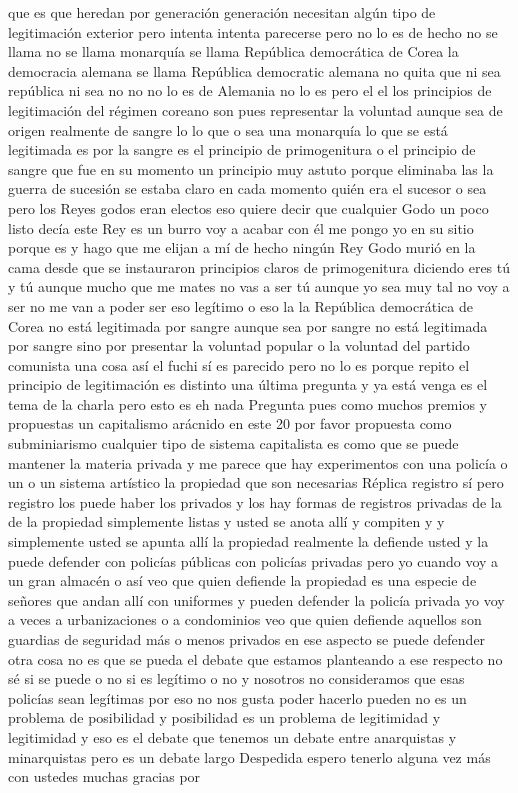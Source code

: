 que es que heredan por generación generación necesitan algún tipo de legitimación exterior pero intenta
intenta parecerse pero no lo es de hecho no se llama no se llama monarquía se llama República democrática de Corea
la democracia alemana se llama República democratic alemana no quita que ni sea república ni sea no
no no lo es de Alemania no lo es pero el el los principios de legitimación del régimen coreano son
pues representar la voluntad aunque sea de origen realmente de sangre lo lo que o sea una monarquía
lo que se está legitimada es por la sangre es el principio de primogenitura o el principio de sangre que fue en su momento un principio muy astuto
porque eliminaba las la guerra de sucesión se estaba claro en cada momento quién era el sucesor o sea pero los Reyes godos eran electos
eso quiere decir que cualquier Godo un poco listo decía este Rey es un burro voy a acabar con él me pongo yo en su sitio porque es
y hago que me elijan a mí de hecho ningún Rey Godo murió en la cama desde que se instauraron principios claros
de primogenitura diciendo eres tú y tú aunque mucho que me mates no vas a ser tú
aunque yo sea muy tal no voy a ser no me van a poder ser eso legítimo o eso la la República democrática de Corea
no está legitimada por sangre aunque sea por sangre no está legitimada por sangre sino por presentar la voluntad popular
o la voluntad del partido comunista una cosa así el fuchi sí
es parecido pero no lo es porque repito el principio de legitimación es distinto
una última pregunta y ya está venga es el tema de la charla pero esto es eh nada
Pregunta
pues como muchos premios y propuestas un capitalismo arácnido en este 20 por favor propuesta como subminiarismo
cualquier tipo de sistema capitalista es como que se puede mantener la materia privada
y me parece que hay experimentos con una policía o un o un sistema artístico la propiedad que son necesarias
Réplica
registro sí pero registro los puede haber los privados y los hay formas de registros privadas de la de la propiedad
simplemente listas y usted se anota allí y compiten y y simplemente usted se apunta allí
la propiedad realmente la defiende usted y la puede defender con policías públicas con policías privadas
pero yo cuando voy a un gran almacén o así veo que quien defiende la propiedad es una especie de señores que andan allí con uniformes y pueden defender la policía privada
yo voy a veces a urbanizaciones o a condominios veo que quien defiende aquellos son guardias de seguridad
más o menos privados en ese aspecto se puede defender otra cosa no es que se pueda
el debate que estamos planteando a ese respecto no sé si se puede o no si es legítimo o no y nosotros
no consideramos que esas policías sean legítimas por eso no nos gusta poder hacerlo pueden no es un problema de posibilidad y posibilidad
es un problema de legitimidad y legitimidad y eso es el debate que tenemos un debate entre anarquistas y minarquistas pero es un debate largo
Despedida
espero tenerlo alguna vez más con ustedes muchas gracias por

